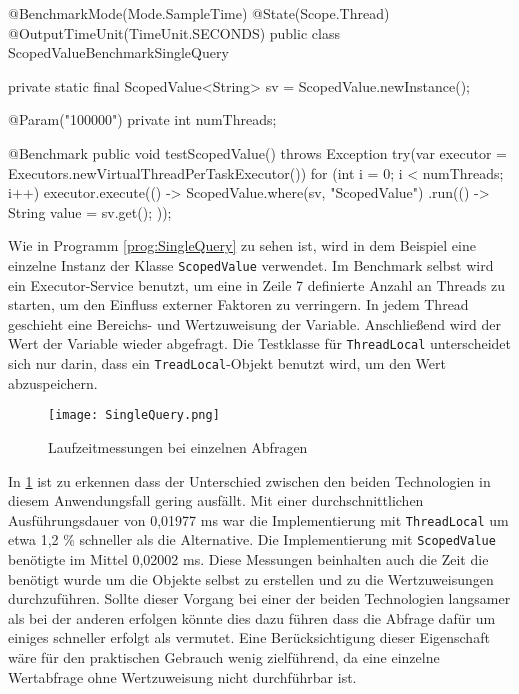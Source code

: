     \begin{program} [H]
        \caption{Laufzeit bei einzelnen Abfragen}
        \label{prog:SingleQuery}
    \begin{JavaCode}[language=Java, numbers=left]
@BenchmarkMode(Mode.SampleTime)
@State(Scope.Thread)
@OutputTimeUnit(TimeUnit.SECONDS)
public class ScopedValueBenchmarkSingleQuery {
    private static final ScopedValue<String> sv = ScopedValue.newInstance();

    @Param({"100000"})
    private int numThreads;

    @Benchmark
    public void testScopedValue() throws Exception {
        try(var executor = Executors.newVirtualThreadPerTaskExecutor()) {
            for (int i = 0; i < numThreads; i++) {
                executor.execute(() -> ScopedValue.where(sv, "ScopedValue")
                .run(() -> { String value = sv.get(); }));
            }
        }
    }
}\end{JavaCode}
    \end{program}

    Wie in Programm \ref{prog:SingleQuery} zu sehen ist, wird in dem Beispiel eine einzelne Instanz der Klasse \texttt{ScopedValue} verwendet. Im Benchmark selbst wird ein Executor-Service benutzt, um eine
    in Zeile 7 definierte Anzahl an Threads zu starten, um den Einfluss externer Faktoren zu verringern. In jedem Thread geschieht eine Bereichs- und Wertzuweisung der Variable.
    Anschließend wird der Wert der Variable wieder abgefragt. Die Testklasse für \texttt{ThreadLocal} unterscheidet sich nur darin, dass ein \texttt{TreadLocal}-Objekt benutzt wird, um den Wert
    abzuspeichern.

    \begin{figure}[H]
        \centering
        \texttt{[image: SingleQuery.png]}
        \caption{Laufzeitmessungen bei einzelnen Abfragen}
        \label{fig:SingleQuery}
    \end{figure}

    In \ref{fig:SingleQuery} ist zu erkennen dass der Unterschied zwischen den beiden Technologien in diesem Anwendungsfall gering ausfällt. Mit einer durchschnittlichen Ausführungsdauer von
    0,01977 ms war die Implementierung mit \texttt{ThreadLocal} um etwa 1,2 \% schneller als die Alternative. Die Implementierung mit \texttt{ScopedValue} benötigte im Mittel 0,02002 ms.
    Diese Messungen beinhalten auch die Zeit die benötigt wurde um die Objekte selbst zu erstellen und zu die Wertzuweisungen durchzuführen. Sollte dieser Vorgang bei einer der beiden Technologien 
    langsamer als bei der anderen erfolgen könnte dies dazu führen dass die Abfrage dafür um einiges schneller erfolgt als vermutet. Eine Berücksichtigung dieser Eigenschaft wäre für den praktischen
    Gebrauch wenig zielführend, da eine einzelne Wertabfrage ohne Wertzuweisung nicht durchführbar ist. 

